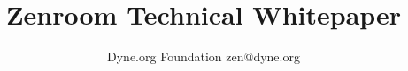 \documentclass{article}
\title{Zenroom Technical Whitepaper}
\author{
  Dyne.org Foundation
  zen@dyne.org
}
\begin{document}
\maketitle

\begin{abstract}
\end{abstract}

\vspace{2cm}
\end{document}
